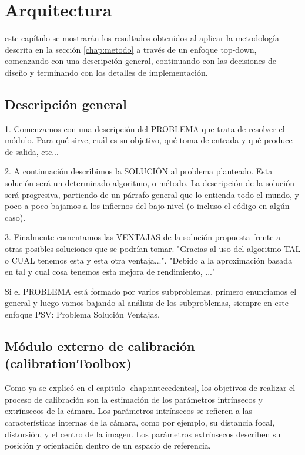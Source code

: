 \chapter{Arquitectura}
\label{chap:arquitectura}
 este capítulo se mostrarán los resultados obtenidos al aplicar la metodología descrita en la sección \ref{chap:metodo} a través de un enfoque top-down, comenzando con una descripción general, continuando con las decisiones de diseño y terminando con los detalles de implementación. 

\section{Descripción general}



1. Comenzamos con una descripción del PROBLEMA que trata de resolver
el módulo. Para qué sirve, cuál es su objetivo, qué toma de entrada y
qué produce de salida, etc...

2. A continuación describimos la SOLUCIÓN al problema planteado. Esta
solución será un determinado algoritmo, o método. La descripción de la
solución será progresiva, partiendo de un párrafo general que lo
entienda todo el mundo, y poco a poco bajamos a los infiernos del bajo
nivel (o incluso el código en algún caso).

3. Finalmente comentamos las VENTAJAS de la solución propuesta frente
a otras posibles soluciones que se podrían tomar. "Gracias al uso del
algoritmo TAL o CUAL tenemos esta y esta otra ventaja...". "Debido a
la aproximación basada en tal y cual cosa tenemos esta mejora de
rendimiento, ..."

Si el PROBLEMA está formado por varios subproblemas, primero
enunciamos el general y luego vamos bajando al análisis de los
subproblemas, siempre en este enfoque PSV: Problema Solución
Ventajas.




\section{Módulo externo de calibración (calibrationToolbox)}
Como ya se explicó en el capitulo \ref{chap:antecedentes}, los objetivos de realizar el proceso de calibración son la estimación de los parámetros intrínsecos y extrínsecos de la cámara. Los parámetros intrínsecos se refieren a las características internas de la cámara, como por ejemplo, su distancia focal, distorsión, y el centro de la imagen. Los parámetros extrínsecos describen su posición y orientación dentro de un espacio de referencia. 

